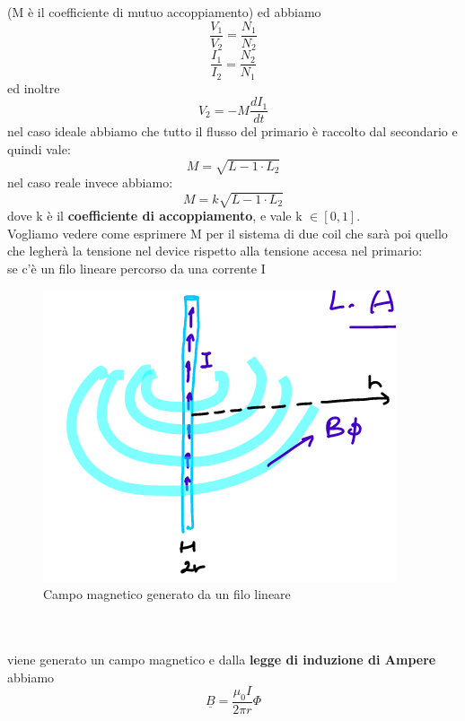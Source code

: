 \documentclass[oneside, 12pt]{extbook}
\begin{document}
(M è il coefficiente di mutuo accoppiamento) ed abbiamo 
\begin{equation}
	\frac{V_1}{V_2} = \frac{N_1}{N_2}
\end{equation}
\begin{equation}
	\frac{I_1}{I_2} = \frac{N_2}{N_1}
\end{equation}
ed inoltre
\begin{equation}
	V_2 = -M \frac{dI_1}{dt}
\end{equation}
nel caso ideale abbiamo che tutto il flusso del primario è raccolto dal secondario e quindi vale:
\begin{equation}
	M = \sqrt{L-1 \cdot L_2}
\end{equation}
nel caso reale invece abbiamo:
\begin{equation}
	M = k \sqrt{L-1 \cdot L_2}
\end{equation}
dove k è il \textbf{coefficiente di accoppiamento}, e vale k $\in [0,1]$.\\
Vogliamo vedere come esprimere M per il sistema di due coil che sarà poi quello che legherà la tensione nel device rispetto alla tensione accesa nel primario:\\se c'è un filo lineare percorso da una corrente I\\
\begin{figure}[!h]
	\includegraphics[scale=0.6]{immagini/corrente_filo.png}
	\caption{Campo magnetico generato da un filo lineare}
\end{figure}\\\\
viene generato un campo magnetico e dalla \textbf{legge di induzione di Ampere} abbiamo
\begin{equation}
	\underline{B} = \frac{\mu_0 I}{2 \pi r}\Phi
\end{equation}
\end{document}

